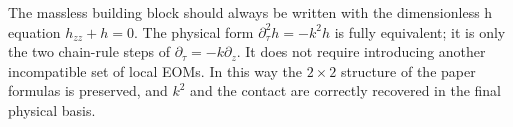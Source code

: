\documentclass[11pt,a4paper]{article}
\begin{document}
The massless building block should always be written with the dimensionless h equation $h_{zz}+h=0$. The physical form $\partial_\tau^2h=-k^2h$ is fully equivalent; it is only the two chain-rule steps of $\partial_\tau=-k\partial_z$. It does not require introducing another incompatible set of local EOMs. In this way the $2\times2$ structure of the paper formulas is preserved, and $k^2$ and the contact are correctly recovered in the final physical basis.



\end{document}
